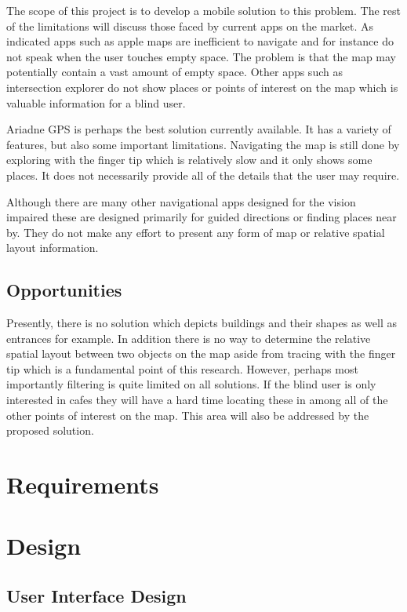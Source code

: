 \documentclass[11pt,twoside,a4paper]{article}
\begin{document}
The scope of this project is to develop a mobile solution to this
problem. The rest of the limitations will discuss those faced by current
apps on the market. As indicated apps such as apple maps are inefficient
to navigate and for instance do not speak when the user touches empty
space. The problem is that the map may potentially contain a vast amount
of empty space. Other apps such as intersection explorer do not show
places or points of interest on the map which is valuable information
for a blind user. 

Ariadne GPS is perhaps the best solution currently available. It has a
variety of features, but also some important limitations. Navigating the
map is still done by exploring with the finger tip which is relatively
slow and it only shows some places. It does not necessarily provide all
of the details that the user may require.

Although there are many other navigational apps designed for the vision
impaired these are designed primarily for guided directions or finding
places near by. They do not make any effort to present any form of map
or relative spatial layout information.

\subsection{Opportunities}
Presently, there is no solution which depicts buildings and their shapes
as well as entrances for example. In addition there is no way to
determine the relative spatial layout between two objects on the map
aside from tracing with the finger tip which is a fundamental point of
this research. However, perhaps most importantly filtering is quite
limited on all solutions. If the blind user is only interested in cafes
they will have a hard time locating these in among all of the other
points of interest on the map. This area will also be addressed by the
proposed solution.

\section{Requirements}

\section{Design}

\subsection{User Interface Design}
\end{document}
